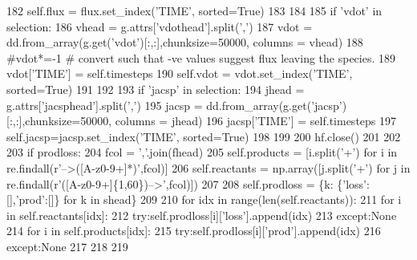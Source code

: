 \begin{DoxyCode}
182                 self.flux = flux.set\_index(\textcolor{stringliteral}{'TIME'}, sorted=\textcolor{keyword}{True})
183 
184 
185             \textcolor{keywordflow}{if} \textcolor{stringliteral}{'vdot'} \textcolor{keywordflow}{in} selection:
186                 vhead = g.attrs[\textcolor{stringliteral}{'vdothead'}].split(\textcolor{stringliteral}{','})
187                 vdot = dd.from\_array(g.get(\textcolor{stringliteral}{'vdot'})[:,:],chunksize=50000, columns = vhead)
188                 \textcolor{comment}{#vdot*=-1 # convert such that -ve values suggest flux leaving the species.}
189                 vdot[\textcolor{stringliteral}{'TIME'}] = self.timesteps
190                 self.vdot = vdot.set\_index(\textcolor{stringliteral}{'TIME'}, sorted=\textcolor{keyword}{True})
191 
192 
193             \textcolor{keywordflow}{if} \textcolor{stringliteral}{'jacsp'} \textcolor{keywordflow}{in} selection:
194                 jhead = g.attrs[\textcolor{stringliteral}{'jacsphead'}].split(\textcolor{stringliteral}{','})
195                 jacsp = dd.from\_array(g.get(\textcolor{stringliteral}{'jacsp'})[:,:],chunksize=50000, columns = jhead)
196                 jacsp[\textcolor{stringliteral}{'TIME'}] = self.timesteps
197                 self.jacsp=jacsp.set\_index(\textcolor{stringliteral}{'TIME'}, sorted=\textcolor{keyword}{True})
198 
199 
200             hf.close()
201 
202 
203             \textcolor{keywordflow}{if} prodloss:
204                 fcol = \textcolor{stringliteral}{','}.join(fhead)
205                 self.products = [i.split(\textcolor{stringliteral}{'+'}) \textcolor{keywordflow}{for} i \textcolor{keywordflow}{in} re.findall(\textcolor{stringliteral}{r'-->([A-z0-9+]*)'},fcol)]
206                 self.reactants = np.array([j.split(\textcolor{stringliteral}{'+'}) \textcolor{keywordflow}{for} j \textcolor{keywordflow}{in} re.findall(\textcolor{stringliteral}{r'([A-z0-9+]\{1,60\})-->'},fcol)])
207 
208                 self.prodloss = \{k: \{\textcolor{stringliteral}{'loss'}:[],\textcolor{stringliteral}{'prod'}:[]\} \textcolor{keywordflow}{for} k \textcolor{keywordflow}{in} shead\}
209                 
210                 \textcolor{keywordflow}{for} idx \textcolor{keywordflow}{in} range(len(self.reactants)):
211                     \textcolor{keywordflow}{for} i \textcolor{keywordflow}{in} self.reactants[idx]:
212                         \textcolor{keywordflow}{try}:self.prodloss[i][\textcolor{stringliteral}{'loss'}].append(idx)
213                         \textcolor{keywordflow}{except}:\textcolor{keywordtype}{None}
214                     \textcolor{keywordflow}{for} i \textcolor{keywordflow}{in} self.products[idx]:
215                         \textcolor{keywordflow}{try}:self.prodloss[i][\textcolor{stringliteral}{'prod'}].append(idx)
216                         \textcolor{keywordflow}{except}:\textcolor{keywordtype}{None}
217 
218 
219 \end{DoxyCode}


